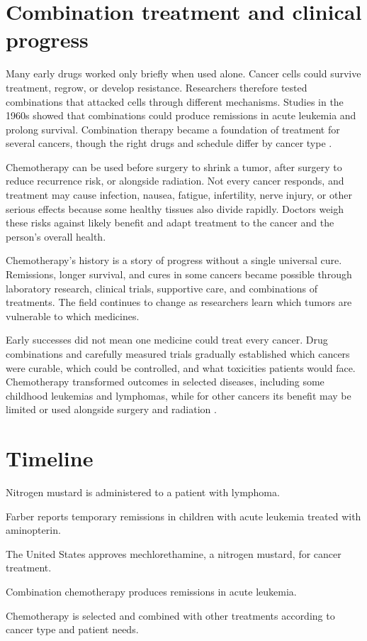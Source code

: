 \documentclass[12pt,oneside]{book}
\begin{document}
\section{Combination treatment and clinical progress}
Many early drugs worked only briefly when used alone. Cancer cells could
survive treatment, regrow, or develop resistance. Researchers therefore
tested combinations that attacked cells through different mechanisms.
Studies in the 1960s showed that combinations could produce remissions in
acute leukemia and prolong survival. Combination therapy became a
foundation of treatment for several cancers, though the right drugs and
schedule differ by cancer type \cite{nciCancerMilestones,aacrChemotherapyHistory}.

Chemotherapy can be used before surgery to shrink a tumor, after surgery
to reduce recurrence risk, or alongside radiation. Not every cancer
responds, and treatment may cause infection, nausea, fatigue, infertility,
nerve injury, or other serious effects because some healthy tissues also
divide rapidly. Doctors weigh these risks against likely benefit and adapt
treatment to the cancer and the person's overall health.

Chemotherapy's history is a story of progress without a single universal
cure. Remissions, longer survival, and cures in some cancers became
possible through laboratory research, clinical trials, supportive care,
and combinations of treatments. The field continues to change as
researchers learn which tumors are vulnerable to which medicines.

Early successes did not mean one medicine could treat every cancer. Drug
combinations and carefully measured trials gradually established which cancers
were curable, which could be controlled, and what toxicities patients would
face. Chemotherapy transformed outcomes in selected diseases, including some
childhood leukemias and lymphomas, while for other cancers its benefit may be
limited or used alongside surgery and radiation
\cite{farberDanaHistory,nciCancerMilestones}.

\section*{Timeline}
\begin{description}[leftmargin=2.3cm,style=nextline]
  \item[1942] Nitrogen mustard is administered to a patient with lymphoma.
  \item[1947] Farber reports temporary remissions in children with acute leukemia treated with aminopterin.
  \item[1949] The United States approves mechlorethamine, a nitrogen mustard, for cancer treatment.
  \item[1960s] Combination chemotherapy produces remissions in acute leukemia.
  \item[Today] Chemotherapy is selected and combined with other treatments according to cancer type and patient needs.
\end{description}
\end{document}
